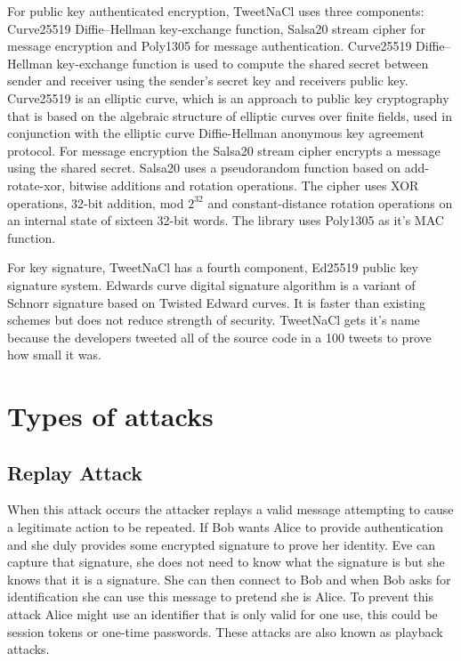 For public key authenticated encryption, TweetNaCl uses three components: Curve25519 Diffie–Hellman key-exchange function, Salsa20 stream cipher for message encryption and Poly1305 for message authentication. Curve25519 Diffie–Hellman key-exchange function is used to compute the shared secret between sender and receiver using the sender's secret key and receivers public key. Curve25519 is an elliptic curve, which is an approach to public key cryptography that is based on the algebraic structure of elliptic curves over finite fields, used in conjunction with the elliptic curve Diffie-Hellman anonymous key agreement protocol\cite{curve}. For message encryption the Salsa20 stream cipher encrypts a message using the shared secret. Salsa20 uses a pseudorandom function based on add-rotate-xor, bitwise additions and rotation operations. The cipher uses XOR operations, 32-bit addition, mod $2^{32}$ and constant-distance rotation operations on an internal state of sixteen 32-bit words\cite{salsa}. The library uses Poly1305 as it's MAC function\cite{poly}.

For key signature, TweetNaCl has a fourth component, Ed25519 public key signature system. Edwards curve digital signature algorithm is a variant of Schnorr signature based on Twisted Edward curves. It is faster than existing schemes but does not reduce strength of security\cite{ed25}. TweetNaCl gets it's name because the developers tweeted all of the source code in a 100 tweets to prove how small it was.


\section{Types of attacks}

\subsection{Replay Attack}

When this attack occurs the attacker replays a valid message attempting to cause a legitimate action to be repeated. If Bob wants Alice to provide authentication and she duly provides some encrypted signature to prove her identity. Eve can capture that signature, she does not need to know what the signature is but she knows that it is a signature. She can then connect to Bob and when Bob asks for identification she can use this message to pretend she is Alice. To prevent this attack Alice might use an identifier that is only valid for one use, this could be session tokens or one-time passwords. These attacks are also known as playback attacks.

